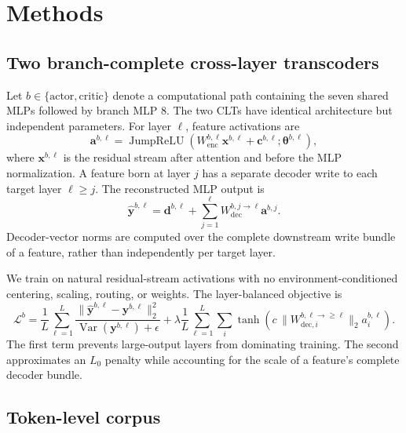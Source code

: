 \section{Methods}

\subsection{Two branch-complete cross-layer transcoders}

Let $b\in\{\mathrm{actor},\mathrm{critic}\}$ denote a computational path containing the seven shared MLPs followed by branch MLP $8$. The two CLTs have identical architecture but independent parameters. For layer $\ell$, feature activations are
\begin{equation}
    \mathbf{a}^{b,\ell}=\operatorname{JumpReLU}\!\left(W_{\mathrm{enc}}^{b,\ell}\mathbf{x}^{b,\ell}+\mathbf{c}^{b,\ell};\boldsymbol{\theta}^{b,\ell}\right),
\end{equation}
where $\mathbf{x}^{b,\ell}$ is the residual stream after attention and before the MLP normalization. A feature born at layer $j$ has a separate decoder write to each target layer $\ell\geq j$. The reconstructed MLP output is
\begin{equation}
    \widehat{\mathbf{y}}^{b,\ell}=\mathbf{d}^{b,\ell}+\sum_{j=1}^{\ell}W_{\mathrm{dec}}^{b,j\rightarrow\ell}\mathbf{a}^{b,j}.
\end{equation}
Decoder-vector norms are computed over the complete downstream write bundle of a feature, rather than independently per target layer.

We train on natural residual-stream activations with no environment-conditioned centering, scaling, routing, or weights. The layer-balanced objective is
\begin{equation}
    \mathcal{L}^{b}=\frac{1}{L}\sum_{\ell=1}^{L}
    \frac{\|\widehat{\mathbf{y}}^{b,\ell}-\mathbf{y}^{b,\ell}\|_2^2}
         {\operatorname{Var}(\mathbf{y}^{b,\ell})+\epsilon}
    +\lambda\frac{1}{L}\sum_{\ell=1}^{L}\sum_i
    \tanh\!\left(c\,\|W_{\mathrm{dec},i}^{b,\ell\rightarrow\geq\ell}\|_2a_i^{b,\ell}\right).
\end{equation}
The first term prevents large-output layers from dominating training. The second approximates an $L_0$ penalty while accounting for the scale of a feature's complete decoder bundle.

\subsection{Token-level corpus}

